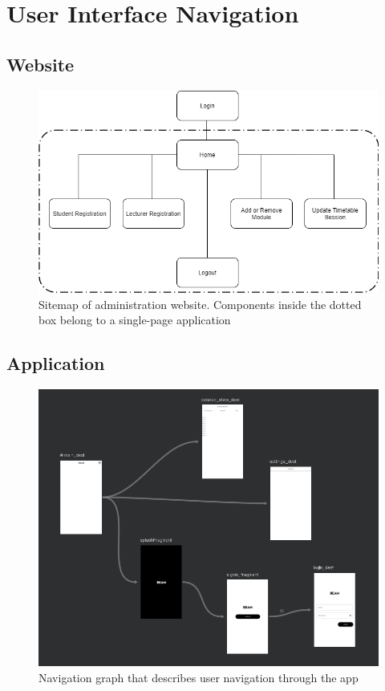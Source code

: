 \documentclass[../report.tex]{subfiles}
\begin{document}
\section{User Interface Navigation}
\subsection{Website}
\begin{figure}[H]
\centering
\includegraphics[width=.8\textwidth]{./images/05/05-web-nav.png}
\caption{Sitemap of administration website. Components  inside the dotted box belong to a single-page application}
\label{fig:web-nav}
\end{figure}

\subsection{Application}
\begin{figure}[H]
\centering
\includegraphics[width=.8\textwidth]{./images/05/05-app-nav.png}
\caption{Navigation graph that describes user navigation through the app}
\label{fig:app-nav}
\end{figure}
\end{document}
